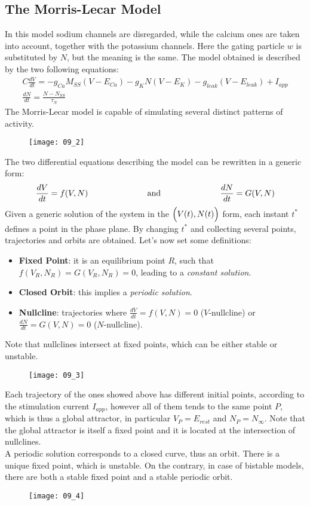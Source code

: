 \subsection{The Morris-Lecar Model}
In this model sodium channels are disregarded, while the calcium ones are taken into account, together with the
potassium channels. Here the gating particle \(w\) is substituted by \(N\), but the meaning is the same.
The model obtained is described by the two following equations:
\begin{gather*}
    C\frac{dV}{dt}=-g_{Ca}M_{SS}(V-E_{Ca})-g_{K}N(V-E_{K})-g_{leak}(V-E_{leak})+I_{app}\\
    \frac{dN}{dt}=\frac{N-N_{SS}}{\tau_{N}}
\end{gather*}
The Morris-Lecar model is capable of simulating several distinct patterns of activity.
\begin{figure}[H]
    \texttt{[image: 09\_2]}
    \centering
\end{figure}
The two differential equations describing the model can be rewritten in a generic form:
\begin{equation*}
    \frac{dV}{dt}=f(V,N)\hspace{2.5cm}\text{and}\hspace{2.5cm}\frac{dN}{dt}=G(V,N)
\end{equation*}
Given a generic solution of the system in the \(\Bigl(V(t),N(t)\Bigr)\) form, each instant \(t^{*}\) defines
a point in the phase plane. By changing \(t^{*}\) and collecting several points, trajectories and
orbits are obtained. Let's now set some definitions:
\begin{itemize}
    \item \textbf{Fixed Point}: it is an equilibrium point \(R\), such that \(f(V_{R},N_{R})=G(V_{R},N_{R})=0\),
          leading to a \textit{constant solution}.
    \item \textbf{Closed Orbit}: this implies a \textit{periodic solution}.
    \item \textbf{Nullcline}: trajectories where \(\frac{dV}{dt}=f(V,N)=0\) (\(V\)-nullcline) or
          \(\frac{dN}{dt}=G(V,N)=0\) (\(N\)-nullcline).
\end{itemize}
Note that nullclines intersect at fixed points, which can be either stable or unstable.
\begin{figure}[H]
    \texttt{[image: 09\_3]}
    \centering
\end{figure}
Each trajectory of the ones showed above has different initial points, according to the stimulation current
\(I_{app}\), however all of them tends to the same point \(P\), which is thus a global attractor,
in particular \(V_{P}=E_{rest}\) and \(N_{P}=N_{\infty}\). Note that the global attractor is itself a
fixed point and it is located at the intersection of nullclines.\\
A periodic solution corresponds to a closed curve, thus an orbit. There is a unique fixed point, which
is unstable. On the contrary, in case of bistable models, there are both a stable fixed point and a
stable periodic orbit.
\begin{figure}[H]
    \texttt{[image: 09\_4]}
    \centering
\end{figure}

